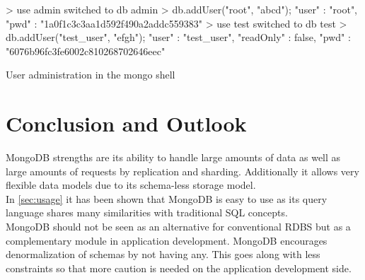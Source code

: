 \begin{listing}
    \begin{javascriptcode}
> use admin
switched to db admin
> db.addUser("root", "abcd");
{
"user" : "root",
"pwd" : "1a0f1c3c3aa1d592f490a2addc559383"
}
> use test
switched to db test
> db.addUser("test_user", "efgh");
{
"user" : "test_user",
"readOnly" : false,
"pwd" : "6076b96fc3fe6002c810268702646eec"
}
    \end{javascriptcode}
    \caption{User administration in the mongo shell}
    \label{lst:mongo-auth}
\end{listing}



\newpage
\section{Conclusion and Outlook}
\label{sec:conclusion}

MongoDB strengths are its ability to handle large amounts of data as well as
large amounts of requests by replication and sharding. Additionally it allows
very flexible data models due to its schema-less storage model.\\
In \autoref{sec:usage} it has been shown that MongoDB is easy to use as its
query language shares many similarities with traditional SQL concepts.\\
MongoDB should not be seen as an alternative for conventional RDBS but as a
complementary module in application development. MongoDB encourages
denormalization of schemas by not having any. This goes along with less
constraints so that more caution is needed on the application development side.





